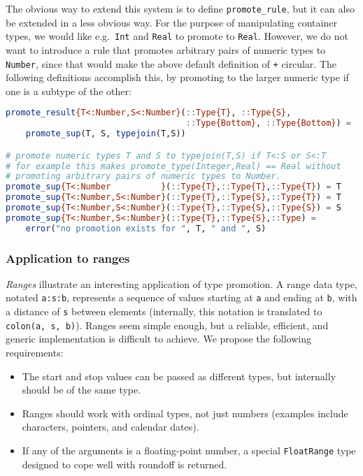 The obvious way to extend this system is to define \texttt{promote\_rule},
but it can also be extended in a less obvious way.
For the purpose of manipulating container types, we would like e.g.\ \texttt{Int}
and \texttt{Real} to promote to \texttt{Real}.
However, we do not want to introduce a rule that promotes arbitrary pairs of
numeric types to \texttt{Number}, since that would make the above
default definition of \texttt{+} circular.
The following definitions accomplish this, by promoting to the larger
numeric type if one is a subtype of the other:

\begin{samepage}
\begin{singlespace}
\begin{lstlisting}[language=julia]
promote_result{T<:Number,S<:Number}(::Type{T}, ::Type{S},
                                    ::Type{Bottom}, ::Type{Bottom}) =
    promote_sup(T, S, typejoin(T,S))

# promote numeric types T and S to typejoin(T,S) if T<:S or S<:T
# for example this makes promote_type(Integer,Real) == Real without
# promoting arbitrary pairs of numeric types to Number.
promote_sup{T<:Number          }(::Type{T},::Type{T},::Type{T}) = T
promote_sup{T<:Number,S<:Number}(::Type{T},::Type{S},::Type{T}) = T
promote_sup{T<:Number,S<:Number}(::Type{T},::Type{S},::Type{S}) = S
promote_sup{T<:Number,S<:Number}(::Type{T},::Type{S},::Type) =
    error("no promotion exists for ", T, " and ", S)
\end{lstlisting}
\end{singlespace}
\end{samepage}

\subsubsection{Application to ranges}

\emph{Ranges} illustrate an interesting application of type promotion.
A range data type, notated \texttt{a:s:b}, represents a sequence of values
starting at \texttt{a} and ending at \texttt{b}, with a distance of \texttt{s}
between elements (internally, this notation is translated to
\texttt{colon(a, s, b)}).
Ranges seem simple enough, but a reliable, efficient, and generic implementation
is difficult to achieve.
We propose the following requirements:

\begin{itemize}
\item The start and stop values can be passed as different types, but internally
  should be of the same type.
\item Ranges should work with ordinal types, not just numbers (examples include
  characters, pointers, and calendar dates).
\item If any of the arguments is a floating-point number, a special
  \texttt{FloatRange} type designed to cope well with roundoff is returned.
\end{itemize}

